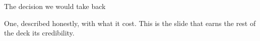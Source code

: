 
\begin{frame}{The decision we would take back}
  \begin{pullquote}
  One, described honestly, with what it cost. This is the slide that earns the rest of the
  deck its credibility.
  \end{pullquote}
\end{frame}
